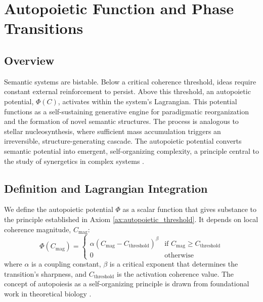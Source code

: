 \chapter{Autopoietic Function and Phase Transitions}
\label{ch:autopoietic_function_and_phase_transitions}


\section{Overview}

Semantic systems are bistable. Below a critical coherence threshold, ideas require constant external reinforcement to persist. Above this threshold, an autopoietic potential, \(\Phi(C)\), activates within the system's Lagrangian. This potential functions as a self-sustaining generative engine for paradigmatic reorganization and the formation of novel semantic structures. The process is analogous to stellar nucleosynthesis, where sufficient mass accumulation triggers an irreversible, structure-generating cascade. The autopoietic potential converts semantic potential into emergent, self-organizing complexity, a principle central to the study of synergetics in complex systems \autocite{Haken1983}.


\section{Definition and Lagrangian Integration}
\label{sec:definition_and_lagrangian_integration}

We define the autopoietic potential \(\Phi\) as a scalar function that gives substance to the principle established in Axiom \ref{ax:autopoietic_threshold}. It depends on local coherence magnitude, \(C_{\mathrm{mag}}\):
\begin{equation}\label{eq:autopoietic_potential}
\Phi(C_{\mathrm{mag}}) =
\begin{cases}
\alpha (C_{\mathrm{mag}} - C_{\text{threshold}})^{\beta} & \text{if } C_{\mathrm{mag}} \geq C_{\text{threshold}} \\
0 & \text{otherwise}
\end{cases}
\end{equation}
where \(\alpha\) is a coupling constant, \(\beta\) is a critical exponent that determines the transition's sharpness, and \(C_{\text{threshold}}\) is the activation coherence value. The concept of autopoiesis as a self-organizing principle is drawn from foundational work in theoretical biology \autocite{MaturanaVarela1980}.


